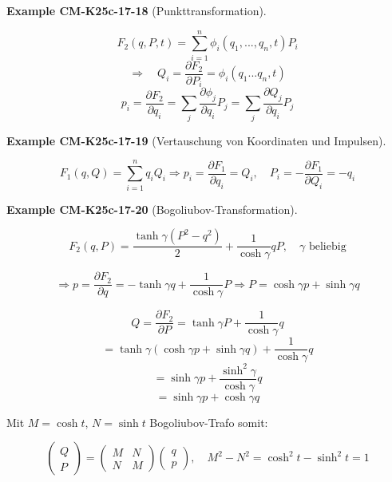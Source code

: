 \documentclass[10pt, letterpaper]{article}
\newcommand{\CustomHeading}[3]{%
  \par\medskip\noindent%
  \textbf{#1 #2} \textnormal{(#3)}.\enskip%
}
\newenvironment{EXA}[2]{\CustomHeading{Example}{#1}{#2}}{}
\begin{document}
\begin{EXA}{CM-K25c-17-18}{Punkttransformation}
\[F_2(q,P,t) = \sum_{i=1}^n \phi_i(q_1,...,q_n,t)P_i\]
\[\Rightarrow \quad Q_i = \frac{\partial F_2}{\partial P_i} = \phi_i(q_1...q_n,t)\]
\[p_i = \frac{\partial F_2}{\partial q_i} = \sum_j \frac{\partial \phi_j}{\partial q_i}P_j = \sum_j \frac{\partial Q_j}{\partial q_i}P_j\]
\end{EXA}

\begin{EXA}{CM-K25c-17-19}{Vertauschung von Koordinaten und Impulsen}
\[F_1(q,Q) = \sum_{i=1}^n q_iQ_i \Rightarrow p_i = \frac{\partial F_1}{\partial q_i} = Q_i, \quad P_i = -\frac{\partial F_1}{\partial Q_i} = -q_i\]
\end{EXA}

\begin{EXA}{CM-K25c-17-20}{Bogoliubov-Transformation}
\[F_2(q,P) = \frac{\tanh\gamma(P^2-q^2)}{2} + \frac{1}{\cosh\gamma}qP, \quad \gamma \text{ beliebig}\]

\[\Rightarrow p = \frac{\partial F_2}{\partial q} = -\tanh\gamma q + \frac{1}{\cosh\gamma}P \Rightarrow P = \cosh\gamma p + \sinh\gamma q\]

\[Q = \frac{\partial F_2}{\partial P} = \tanh\gamma P + \frac{1}{\cosh\gamma}q\]
\[= \tanh\gamma(\cosh\gamma p + \sinh\gamma q) + \frac{1}{\cosh\gamma}q\]
\[= \sinh\gamma p + \frac{\sinh^2\gamma}{\cosh\gamma}q\]
\[= \sinh\gamma p + \cosh\gamma q\]

Mit $M = \cosh t$, $N = \sinh t$ Bogoliubov-Trafo somit:

\[
\begin{pmatrix} Q \\ P \end{pmatrix} = 
\begin{pmatrix} M & N \\ N & M \end{pmatrix}
\begin{pmatrix} q \\ p \end{pmatrix}, \quad M^2 - N^2 = \cosh^2 t - \sinh^2 t = 1
\]
\end{EXA}
\end{document}
